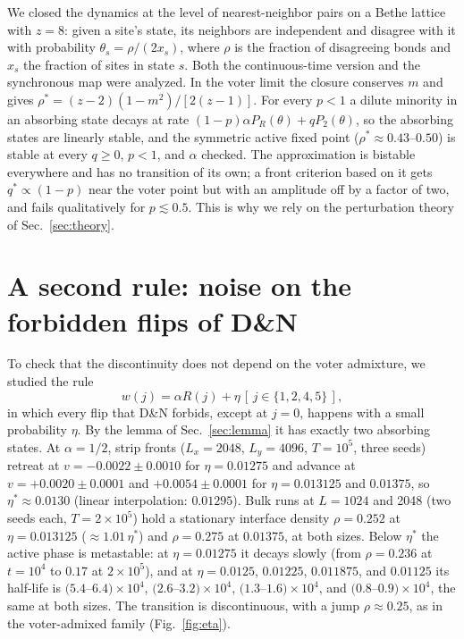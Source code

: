 \documentclass[pre,twocolumn,superscriptaddress,showpacs,floatfix]{revtex4-2}
\newcommand{\qs}{q^{*}}
\begin{document}
We closed the dynamics at the level of nearest-neighbor pairs on a Bethe lattice with $z = 8$:
given a site's state, its neighbors are independent and disagree with it with probability
$\theta_s = \rho/(2x_s)$, where $\rho$ is the fraction of disagreeing bonds and $x_s$ the fraction
of sites in state $s$. Both the continuous-time version and the synchronous map were analyzed.
In the voter limit the closure conserves $m$ and gives $\rho^* = (z-2)(1-m^2)/[2(z-1)]$. For every
$p<1$ a dilute minority in an absorbing state decays at rate
$(1-p)\alpha P_R(\theta) + qP_2(\theta)$, so the absorbing states are linearly stable, and the
symmetric active fixed point ($\rho^*\approx 0.43$--$0.50$) is stable at every $q\ge 0$, $p<1$,
and $\alpha$ checked. The approximation is bistable everywhere and has no transition of its own; a
front criterion based on it gets $\qs\propto(1-p)$ near the voter point but with an amplitude off
by a factor of two, and fails qualitatively for $p\lesssim 0.5$. This is why we rely on the
perturbation theory of Sec.~\ref{sec:theory}.

\section{A second rule: noise on the forbidden flips of D\&N}
\label{app:eta}

To check that the discontinuity does not depend on the voter admixture, we studied the rule
\begin{equation}
w(j) = \alpha R(j) + \eta\,[\,j\in\{1,2,4,5\}\,],
\label{eq:eta}
\end{equation}
in which every flip that D\&N forbids, except at $j = 0$, happens with a small probability $\eta$.
By the lemma of Sec.~\ref{sec:lemma} it has exactly two absorbing states. At $\alpha = 1/2$, strip
fronts ($L_x = 2048$, $L_y = 4096$, $T = 10^5$, three seeds) retreat at $v = -0.0022\pm0.0010$ for
$\eta = 0.01275$ and advance at $v = +0.0020\pm0.0001$ and $+0.0054\pm0.0001$ for $\eta = 0.013125$
and $0.01375$, so $\eta^*\approx 0.0130$ (linear interpolation: $0.01295$). Bulk runs at $L = 1024$ and 2048 (two seeds each,
$T = 2\times10^5$) hold a stationary interface density $\rho = 0.252$ at $\eta = 0.013125$ ($\approx
1.01\,\eta^*$) and $\rho = 0.275$ at $0.01375$, at both sizes. Below $\eta^*$ the active phase is
metastable: at $\eta = 0.01275$ it decays slowly (from $\rho = 0.236$ at $t = 10^4$ to $0.17$ at
$2\times10^5$), and at $\eta = 0.0125$, $0.01225$, $0.011875$, and $0.01125$ its half-life is
$(5.4$--$6.4)\times10^4$, $(2.6$--$3.2)\times10^4$, $(1.3$--$1.6)\times10^4$, and $(0.8$--$0.9)
\times10^4$, the same at both sizes. The transition is discontinuous, with a jump $\rho\approx 0.25$,
as in the voter-admixed family (Fig.~\ref{fig:eta}).
\end{document}
